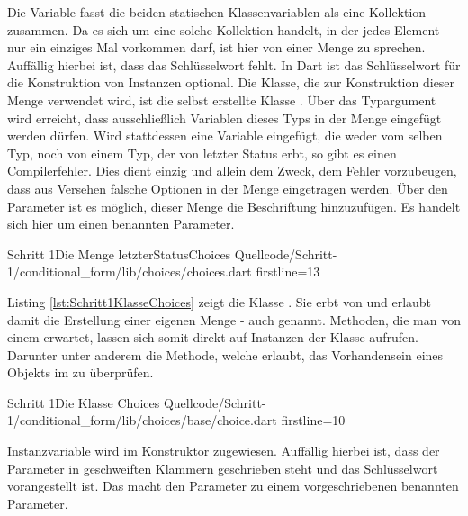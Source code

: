 Die Variable   fasst die beiden statischen Klassenvariablen als eine Kollektion zusammen.
Da es sich um eine solche Kollektion handelt, in der jedes Element nur ein einziges Mal vorkommen darf, ist hier von einer Menge zu sprechen.
Auffällig hierbei ist, dass das Schlüsselwort  fehlt.
In Dart ist das Schlüsselwort für die Konstruktion von Instanzen optional.
Die Klasse, die zur Konstruktion dieser Menge verwendet wird, ist die selbst erstellte Klasse .
Über das Typargument  wird erreicht, dass ausschließlich Variablen  dieses Typs in der Menge eingefügt werden dürfen.
Wird stattdessen eine Variable eingefügt, die weder vom selben Typ, noch von einem Typ, der von letzter Status erbt, so gibt es einen Compilerfehler.
Dies dient einzig und allein dem Zweck, dem  Fehler vorzubeugen, dass aus Versehen falsche Optionen in der Menge eingetragen werden.
Über den Parameter  ist es möglich, dieser Menge die Beschriftung  hinzuzufügen.
 Es handelt sich hier um einen  benannten Parameter.

\begin{alexlisting}{Schritt 1}{Die Menge letzterStatusChoices}
  {Quellcode/Schritt-1/conditional_form/lib/choices/choices.dart}
  {firstline=13}
  \label{lst:Schritt1DieMengeLetzterStatusChoices}
\end{alexlisting}

\clearpage

Listing \ref{lst:Schritt1KlasseChoices} zeigt die Klasse .
Sie erbt von  und erlaubt damit die Erstellung  einer eigenen Menge - auch  genannt.
Methoden, die man von einem  erwartet,  lassen sich somit direkt auf  Instanzen der Klasse  aufrufen.
Darunter unter anderem die  Methode,  welche erlaubt, das Vorhandensein eines Objekts im  zu überprüfen.

\begin{alexlisting}{Schritt 1}{Die Klasse Choices}
  {Quellcode/Schritt-1/conditional_form/lib/choices/base/choice.dart}
  {firstline=10}
  \label{lst:Schritt1KlasseChoices}
\end{alexlisting}

Instanzvariable   wird im Konstruktor  zugewiesen.
Auffällig hierbei ist, dass der Parameter in geschweiften Klammern geschrieben steht und das Schlüsselwort   vorangestellt ist.
Das macht den Parameter zu einem vorgeschriebenen benannten Parameter.

